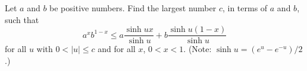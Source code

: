 Let $a$ and $b$ be positive numbers. Find the largest number $c$, in
terms of $a$ and $b$, such that
\[
a^x b^{1-x} \leq a \frac{\sinh ux}{\sinh u} + b \frac{\sinh u(1-x)}{\sinh u}
\]
for all $u$ with $0 < |u| \leq c$ and for all $x$, $0 < x < 1$. (Note:
$\sinh u = (e^u - e^{-u})/2$.)
